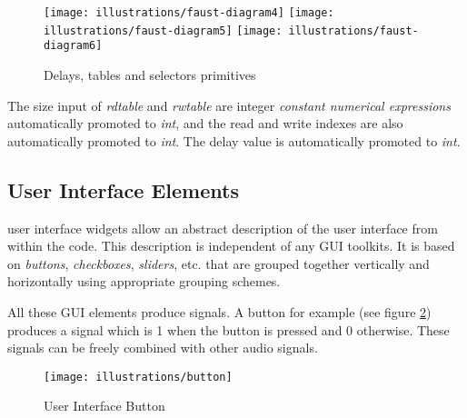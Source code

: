 \begin{figure}
	\centering
	\texttt{[image: illustrations/faust-diagram4]}
	\texttt{[image: illustrations/faust-diagram5]}
	\texttt{[image: illustrations/faust-diagram6]}
	\caption{Delays, tables and selectors primitives }
	\label{fig-delays}
\end{figure}

The size input of \textit{rdtable} and \textit{rwtable} are integer \textit{constant numerical expressions} automatically promoted to \textit{int}, and the read and write indexes are also automatically promoted to \textit{int}. The delay value is automatically promoted to \textit{int}.

\subsection{User Interface Elements}

\faust user interface widgets allow an abstract description of the user interface from within the \faust code. This description is
independent of any GUI toolkits. It is based on \emph{buttons}, \emph{checkboxes}, \emph{sliders}, etc. that are grouped together
vertically and horizontally using appropriate grouping schemes.

All these GUI elements produce signals. A button for example (see figure \ref{fig-button}) produces a signal which is 1 when the button is pressed and 0 otherwise. These signals can be freely combined with other audio signals.

\begin{figure}[h]
	\centering
	\texttt{[image: illustrations/button]}
	\caption{User Interface Button}
	\label{fig-button}
\end{figure}

\bigskip

